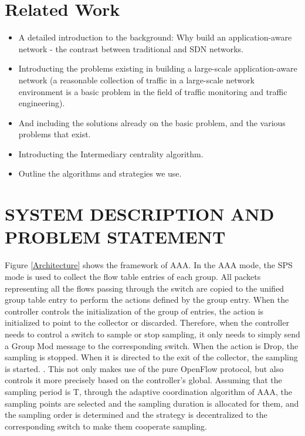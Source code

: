 \documentclass[conference,compsoc]{IEEEtran}
\begin{document}
\section{Related Work}
\begin{itemize}

\item A detailed introduction to the background: Why build an application-aware network - the contrast between traditional and SDN networks. 
\item Introducting the problems existing in building a large-scale application-aware network (a reasonable collection of traffic in a large-scale network environment is a basic problem in the field of traffic monitoring and traffic engineering). 
\item And including the solutions already on the basic problem, and the various problems that exist.
\item Introducting the Intermediary centrality algorithm.
\item Outline the algorithms and strategies we use.

\end{itemize}
\section{SYSTEM DESCRIPTION AND PROBLEM STATEMENT }

Figure \ref{Architecture} shows the framework of AAA. In the AAA mode, the SPS mode is used to collect the flow table entries of each group. All packets representing all the flows passing through the switch are copied to the unified group table entry to perform the actions defined by the group entry. When the controller controls the initialization of the group of entries, the action is initialized to point to the collector or discarded. Therefore, when the controller needs to control a switch to sample or stop sampling, it only needs to simply send a Group Mod message to the corresponding switch. When the action is Drop, the sampling is stopped. When it is directed to the exit of the collector, the sampling is started. . This not only makes use of the pure OpenFlow protocol, but also controls it more precisely based on the controller's global. Assuming that the sampling period is T, through the adaptive coordination algorithm of AAA, the sampling points are selected and the sampling duration is allocated for them, and the sampling order is determined and the strategy is decentralized to the corresponding switch to make them cooperate sampling.
\end{document}
